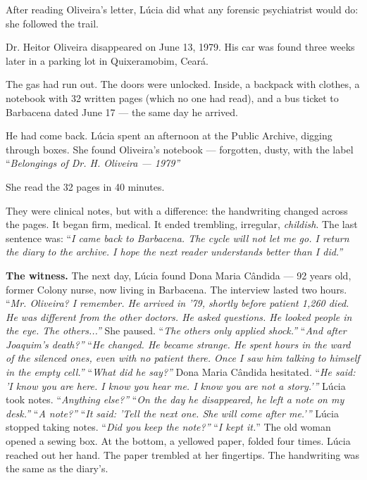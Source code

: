 \noindent After reading Oliveira's letter, Lúcia did what any forensic psychiatrist would do: she followed the trail.

\noindent Dr. Heitor Oliveira disappeared on June 13, 1979. His car was found three weeks later in a parking lot in Quixeramobim, Ceará.

\noindent The gas had run out. The doors were unlocked. Inside, a backpack with clothes, a notebook with 32 written pages (which no one had read), and a bus ticket to Barbacena dated June 17 --- the same day he arrived.

\noindent He had come back.
\noindent Lúcia spent an afternoon at the Public Archive, digging through boxes. She found Oliveira's notebook --- forgotten, dusty, with the label \textquotedblleft{\textit{Belongings of Dr. H. Oliveira --- 1979\textquotedblright}}

\noindent She read the 32 pages in 40 minutes.

\noindent They were clinical notes, but with a difference: the handwriting changed across the pages. It began firm, medical. It ended trembling, irregular, \textit{childish}.
\noindent The last sentence was:
\noindent \textquotedblleft{\textit{I came back to Barbacena. The cycle will not let me go. I return the diary to the archive. I hope the next reader understands better than I did.\textquotedblright{}}}

\noindent \textbf{The witness.}
\noindent The next day, Lúcia found Dona Maria Cândida --- 92 years old, former Colony nurse, now living in Barbacena.
\noindent The interview lasted two hours.
\noindent \textquotedblleft{\textit{Mr. Oliveira? I remember. He arrived in '79, shortly before patient 1,260 died. He was different from the other doctors. He asked questions. He looked people in the eye. The others...\textquotedblright{}} She paused. \textquotedblleft{\textit{The others only applied shock.\textquotedblright{}}}}
\noindent \textquotedblleft{\textit{And after Joaquim's death?\textquotedblright{}}}
\noindent \textquotedblleft{\textit{He changed. He became strange. He spent hours in the ward of the silenced ones, even with no patient there. Once I saw him talking to himself in the empty cell.\textquotedblright{}}}
\noindent \textquotedblleft{\textit{What did he say?\textquotedblright{}}}
\noindent Dona Maria Cândida hesitated.
\noindent \textquotedblleft{\textit{He said: 'I know you are here. I know you hear me. I know you are not a story.'\textquotedblright{}}}
\noindent Lúcia took notes.
\noindent \textquotedblleft{\textit{Anything else?\textquotedblright{}}}
\noindent \textquotedblleft{\textit{On the day he disappeared, he left a note on my desk.\textquotedblright{}}}
\noindent \textquotedblleft{\textit{A note?\textquotedblright{}}}
\noindent \textquotedblleft{\textit{It said: 'Tell the next one. She will come after me.'\textquotedblright{}}}
\noindent Lúcia stopped taking notes.
\noindent \textquotedblleft{\textit{Did you keep the note?\textquotedblright{}}}
\noindent \textquotedblleft{\textit{I kept it.}\textquotedblright} The old woman opened a sewing box. At the bottom, a yellowed paper, folded four times.
\noindent Lúcia reached out her hand. The paper trembled at her fingertips.
\noindent The handwriting was the same as the diary's.

